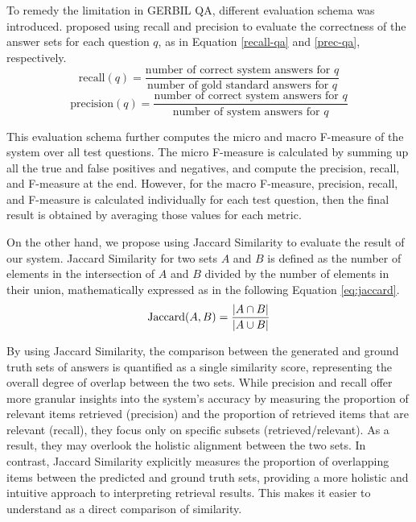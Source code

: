 To remedy the limitation in GERBIL QA, different evaluation schema was introduced.
\cite{Usbeck20189thCO} proposed using recall and precision
to evaluate the correctness of the answer sets for each question $q$, as in Equation \ref{recall-qa}
and \ref{prec-qa}, respectively.
\begin{equation}
    \label{recall-qa}
    \text{recall}(q) = \frac{\text{number of correct system answers for }q}{\text{number of gold standard answers for }q}
\end{equation}
\begin{equation}
    \label{prec-qa}
    \text{precision}(q) = \frac{\text{number of correct system answers for }q}{\text{number of system answers for }q}
\end{equation}

This evaluation schema further computes the micro and macro F-measure of
the system over all test questions. The micro F-measure is calculated 
by summing up all the true and false positives and negatives, and
compute the precision, recall, and F-measure at the end. However, for the
macro F-measure, precision, recall, and F-measure is calculated individually
for each test question, then the final result is obtained by averaging those
values for each metric.

On the other hand, we propose using Jaccard Similarity to evaluate the result of our system. 
Jaccard Similarity for two sets $A$ and $B$ is defined as the number of elements in the intersection of $A$ and $B$ divided by the number of elements in their union, mathematically expressed as in the following Equation \ref{eq:jaccard}.
    \begin{equation}
        \textnormal{Jaccard}(A, B)=\frac{|A \cap B|}{|A \cup B|}
        \label{eq:jaccard}
    \end{equation}

By using Jaccard Similarity, the comparison between the generated and 
ground truth sets of answers is quantified as a single similarity 
score, representing the overall degree of overlap between the two sets. 
While precision and recall offer more granular insights into the system's 
accuracy by measuring the proportion of relevant items retrieved (precision) 
and the proportion of retrieved items that are relevant (recall), they 
focus only on specific subsets (retrieved/relevant). As a result, they 
may overlook the holistic alignment between the two sets. In contrast, 
Jaccard Similarity explicitly measures the proportion of overlapping 
items between the predicted and ground truth sets, providing a more 
holistic and intuitive approach to interpreting retrieval results. This 
makes it easier to understand as a direct comparison of similarity.

